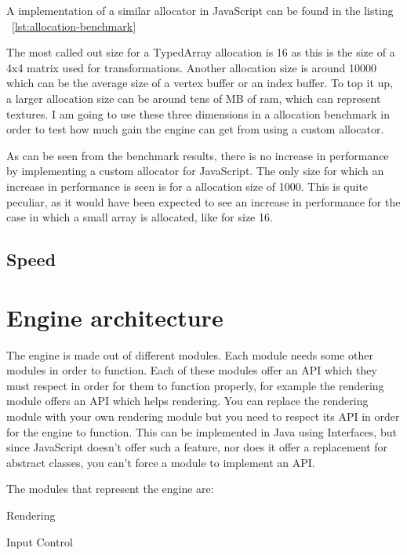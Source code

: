 A implementation of a similar allocator in JavaScript can be found in the listing ~\ref{lst:allocation-benchmark}

\lstset{caption=Allocation benchmark (allocator.js), label=lst:allocation-benchmark}


The most called out size for a TypedArray allocation is 16 as this is the size of a 4x4 matrix used for transformations. Another allocation size is around 10000 which can be the average size of a vertex buffer or an index buffer. To top it up, a larger allocation size can be around tens of MB of ram, which can represent textures. I am going to use these three dimensions in a allocation benchmark in order to test how much gain the engine can get from using a custom allocator.


As can be seen from the benchmark results, there is no increase in performance by implementing a custom allocator for JavaScript. The only size for which an increase in performance is seen is for a allocation size of 1000. This is quite peculiar, as it would have been expected to see an increase in performance for the case in which a small array is allocated, like for size 16.

\subsection{Speed}

\section{Engine architecture}

The engine is made out of different modules. Each module needs some other modules in order to function. Each of these modules offer an API which they must respect in order for them to function properly, for example the rendering module offers an API which helps rendering. You can replace the rendering module with your own rendering module but you need to respect its API in order for the engine to function. This can be implemented in Java using Interfaces, but since JavaScript doesn’t offer such a feature, nor does it offer a replacement for abstract classes, you can’t force a module to implement an API.

The modules that represent the engine are:

\textbullet Rendering

\textbullet Input Control

